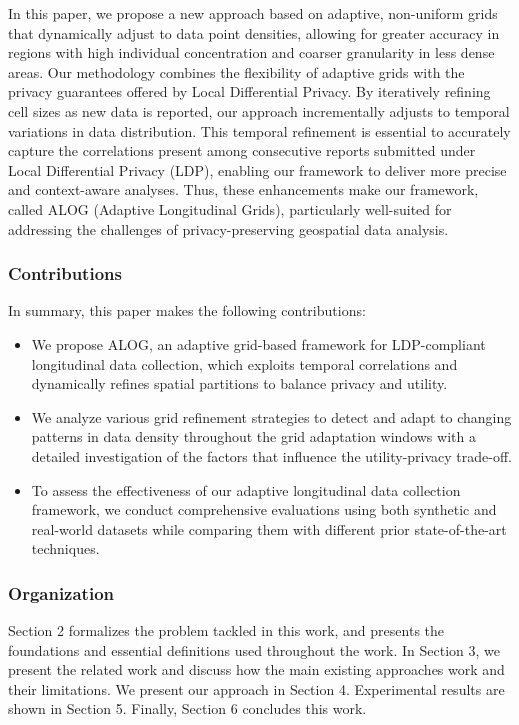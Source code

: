 In this paper, we propose a new approach based on adaptive, non-uniform grids that dynamically adjust to data point densities, allowing for greater accuracy in regions with high individual concentration and coarser granularity in less dense areas. Our methodology combines the flexibility of adaptive grids with the privacy guarantees offered by Local Differential Privacy. By iteratively refining cell sizes as new data is reported, our approach incrementally adjusts to temporal variations in data distribution. This temporal refinement is essential to accurately capture the correlations present among consecutive reports submitted under Local Differential Privacy (LDP), enabling our framework to deliver more precise and context-aware analyses. Thus, these enhancements make our framework, called ALOG (Adaptive Longitudinal Grids), particularly well-suited for addressing the challenges of privacy-preserving geospatial data analysis.
% 
\subsubsection*{Contributions} In summary, this paper makes the following contributions:
\begin{itemize}
    \item We propose ALOG, an adaptive grid-based framework for LDP-compliant longitudinal data collection, which exploits temporal correlations and dynamically refines spatial partitions to balance privacy and utility. 
    \item  We analyze various grid refinement strategies to detect and adapt to changing patterns in data density throughout the grid adaptation windows with a detailed investigation of the factors that influence the utility-privacy trade-off.
    \item To assess the effectiveness of our adaptive longitudinal data collection framework, we conduct comprehensive evaluations using both synthetic and real-world datasets while comparing them with different prior state-of-the-art techniques.
\end{itemize}

\subsubsection*{Organization} Section 2 formalizes the problem tackled in this work, and presents the foundations and essential definitions used throughout the work. In Section 3, we present
the related work and discuss how the main existing approaches
work and their limitations. We present our approach in Section 4. Experimental results are shown in Section 5. Finally, Section 6 concludes
this work.
